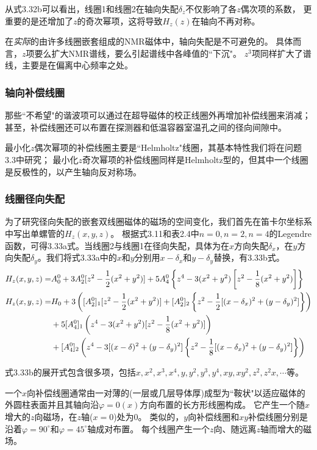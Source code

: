 从式3.32b可以看出，线圈1和线圈2在轴向失配$\delta_z$不仅影响了各$z$偶次项的系数，
更重要的是还增加了$z$的奇次幂项，这将导致$H_z(z)$在轴向不再对称。

在\textit{实际}的由许多线圈嵌套组成的NMR磁体中，轴向失配是不可避免的。
具体而言，$z$项要么扩大NMR谱线，要么引起谱线中各峰值的``下沉"。
$z^3$项同样扩大了谱线，主要是在偏离中心频率之处。

\subsubsection{轴向补偿线圈}
那些``不希望"的谐波项可以通过在超导磁体的校正线圈外再增加补偿线圈来消减；
甚至，补偿线圈还可以布置在探测器和低温容器室温孔之间的径向间隙中。

最小化$z$偶次幂项的补偿线圈主要是``Helmholtz"线圈，其基本特性我们将在问题3.3中研究；
最小化$z$奇次幂项的补偿线圈同样是Helmholtz型的，但其中一个线圈是反极性的，以产生轴向反对称场。

\subsubsection{线圈径向失配}
为了研究径向失配的嵌套双线圈磁体的磁场的空间变化，我们首先在笛卡尔坐标系中写出单螺管的$H_z(x,y,z)$。
根据式3.11和表2.4中$n=0,n=2,n=4$的Legendre函数，可得3.33a式。当线圈2与线圈1在径向失配，具体为在$x$方向失配$\delta_x$，在$y$方向失配$\delta_y$。我们将式3.33a中的$x$和$y$分别用$x-\delta_x$和$y-\delta_y$替换，有3.33b式。
\begin{subequations}
	\begin{align}
  H_z(x,y,z)=&A_0^0+3A_2^0[z^2-\frac{1}{2}(x^2+y^2)]+5A_4^0\left\{z^4-3(x^2+y^2)\left[z^2-\frac{1}{8}(x^2+y^2)\right]\right\}\\
H_z(x,y,z)=&H_0+3\left([A_2^0]_1[z^2-\frac{1}{2}(x^2+y^2)]+[A_2^0]_2\left\{ z^2-\frac{1}{2}[(x-\delta_x)^2+(y-\delta_y)^2]\right\}\right)\\\notag
&+5[A_4^0]_1\left(z^4-3(x^2+y^2)[z^2-\frac{1}{8}(x^2+y^2)]\right)\\\notag
&+[A_4^0]_2\left(z^4-3[(x-\delta)^2+(y-\delta_y)^2]\left\{ z^2-\frac{1}{8}[(x-\delta_x)^2+(y-\delta_y)^2]\right\}\right) 
\end{align}
\end{subequations}

式3.33b的展开式包含很多项，包括$x,x^2,x^3,x^4,y,y^2,y^3,y^4,xy,xy^2,z^2,z^2x,\cdots$等。

一个$x$向补偿线圈通常由一对薄的(一层或几层导体厚)成型为``鞍状"以适应磁体的外圆柱表面并且其轴向沿$\varphi=0(x)$方向布置的长方形线圈构成。
它产生一个随$x$增大的$z$向磁场，在$z$轴($x=0$)处为0。
类似的，$y$向补偿线圈和$xy$补偿线圈分别是沿着$\varphi=90^\circ$和$\varphi=45^\circ$轴成对布置。
每个线圈产生一个$z$向、随远离$z$轴而增大的磁场。

